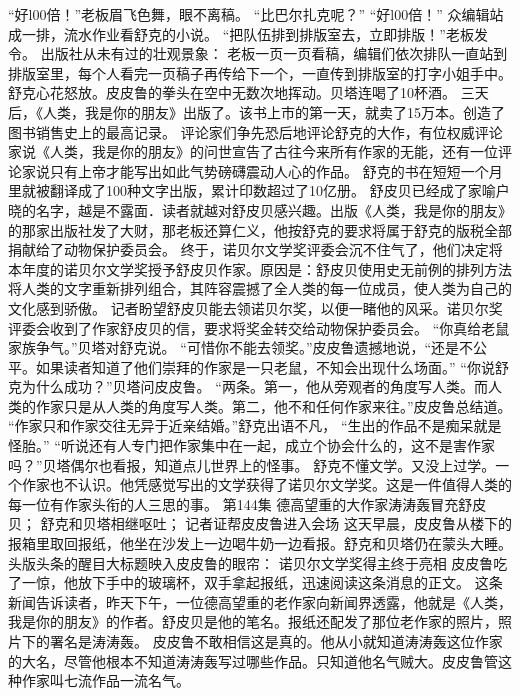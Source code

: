 \documentclass[a4paper,12pt,UTF8,twoside]{ctexbook}
\begin{document}
        “好l00倍！”老板眉飞色舞，眼不离稿。 
        “比巴尔扎克呢？” 
        “好l00倍！” 
        众编辑站成一排，流水作业看舒克的小说。 
        “把队伍排到排版室去，立即排版！”老板发令。 
        出版社从未有过的壮观景象： 
        老板一页一页看稿，编辑们依次排队一直站到排版室里，每个人看完一页稿子再传给下一个，一直传到排版室的打字小姐手中。 
        舒克心花怒放。皮皮鲁的拳头在空中无数次地挥动。贝塔连喝了10杯酒。 
        三天后，《人类，我是你的朋友》出版了。该书上市的第一天，就卖了15万本。创造了图书销售史上的最高记录。 
        评论家们争先恐后地评论舒克的大作，有位权威评论家说《人类，我是你的朋友》的问世宣告了古往今来所有作家的无能，还有一位评论家说只有上帝才能写出如此气势磅礴震动人心的作品。 
        舒克的书在短短一个月里就被翻译成了100种文字出版，累计印数超过了10亿册。 
        舒皮贝已经成了家喻户晓的名字，越是不露面．读者就越对舒皮贝感兴趣。出版《人类，我是你的朋友》的那家出版社发了大财，那老板还算仁义，他按舒克的要求将属于舒克的版税全部捐献给了动物保护委员会。 
        终于，诺贝尔文学奖评委会沉不住气了，他们决定将本年度的诺贝尔文学奖授予舒皮贝作家。原因是：舒皮贝使用史无前例的排列方法将人类的文字重新排列组合，其阵容震撼了全人类的每一位成员，使人类为自己的文化感到骄傲。 
        记者盼望舒皮贝能去领诺贝尔奖，以便一睹他的风采。诺贝尔奖评委会收到了作家舒皮贝的信，要求将奖金转交给动物保护委员会。 
        “你真给老鼠家族争气。”贝塔对舒克说。 
        “可惜你不能去领奖。”皮皮鲁遗撼地说，“还是不公平。如果读者知道了他们崇拜的作家是一只老鼠，不知会出现什么场面。” 
        “你说舒克为什么成功？”贝塔问皮皮鲁。 
        “两条。第一，他从旁观者的角度写人类。而人类的作家只是从人类的角度写人类。第二，他不和任何作家来往。”皮皮鲁总结道。 
        “作家只和作家交往无异于近亲结婚。”舒克出语不凡，  “生出的作品不是痴呆就是怪胎。” 
        “听说还有人专门把作家集中在一起，成立个协会什么的，这不是害作家吗？”贝塔偶尔也看报，知道点儿世界上的怪事。 
        舒克不懂文学。又没上过学。一个作家也不认识。他凭感觉写出的文学获得了诺贝尔文学奖。这是一件值得人类的每一位有作家头衔的人三思的事。   第144集 
        德高望重的大作家涛涛轰冒充舒皮贝； 
        舒克和贝塔相继呕吐； 
        记者证帮皮皮鲁进入会场   
        这天早晨，皮皮鲁从楼下的报箱里取回报纸，他坐在沙发上一边喝牛奶一边看报。舒克和贝塔仍在蒙头大睡。 
        头版头条的醒目大标题映入皮皮鲁的眼帘： 
        诺贝尔文学奖得主终于亮相 
        皮皮鲁吃了一惊，他放下手中的玻璃杯，双手拿起报纸，迅速阅读这条消息的正文。 
        这条新闻告诉读者，昨天下午，一位德高望重的老作家向新闻界透露，他就是《人类，我是你的朋友》的作者。舒皮贝是他的笔名。报纸还配发了那位老作家的照片，照片下的署名是涛涛轰。 
        皮皮鲁不敢相信这是真的。他从小就知道涛涛轰这位作家的大名，尽管他根本不知道涛涛轰写过哪些作品。只知道他名气贼大。皮皮鲁管这种作家叫七流作品一流名气。 
\end{document}
